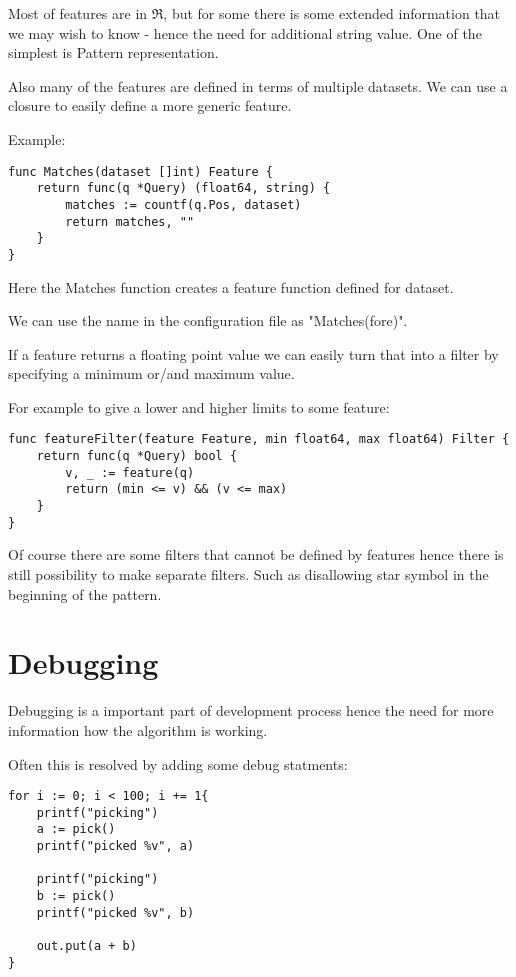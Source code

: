 Most of features are in $\Re$, but for some there
is some extended information that we may wish to know - hence
the need for additional string value. One of the simplest
is Pattern representation.

Also many of the features are defined in terms of multiple datasets.
We can use a closure to easily define a more generic feature.

Example:

\begin{verbatim}
func Matches(dataset []int) Feature {
    return func(q *Query) (float64, string) {
        matches := countf(q.Pos, dataset)
        return matches, ""
    }
}
\end{verbatim}

Here the Matches function creates a feature function defined
for dataset.

We can use the name in the configuration file as "Matches(fore)".

If a feature returns a floating point value we can easily turn that
into a filter by specifying a minimum or/and maximum value.

For example to give a lower and higher limits to some feature:

\begin{verbatim}
func featureFilter(feature Feature, min float64, max float64) Filter {
    return func(q *Query) bool {
        v, _ := feature(q)
        return (min <= v) && (v <= max)
    }
}
\end{verbatim}

Of course there are some filters that cannot be defined by features hence
there is still possibility to make separate filters. Such as disallowing
star symbol in the beginning of the pattern.

\section{Debugging}

Debugging is a important part of development process hence the need for 
more information how the algorithm is working.

Often this is resolved by adding some debug statments:

\begin{verbatim}
for i := 0; i < 100; i += 1{
    printf("picking")
    a := pick()
    printf("picked %v", a)

    printf("picking")
    b := pick()
    printf("picked %v", b)
    
    out.put(a + b)
}
\end{verbatim}

